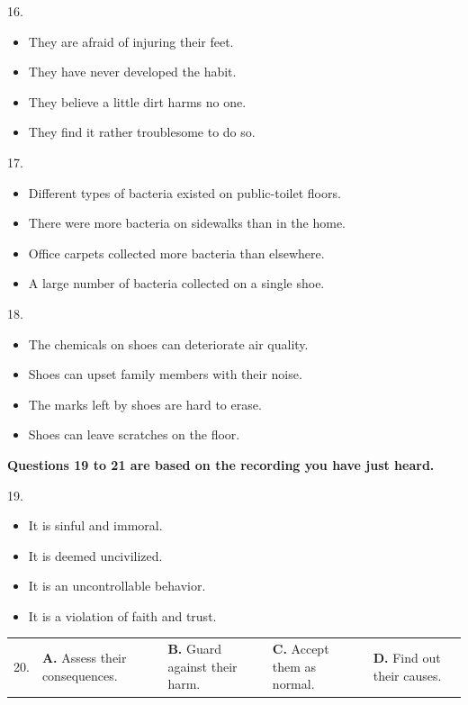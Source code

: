 \documentclass[UTF8,11pt]{ctexart}
\begin{document}
16.


\begin{itemize}[leftmargin=2em,itemsep=.2em,topsep=.4em]\item[A.] They are afraid of injuring their feet.
\item[B.] They have never developed the habit.
\item[C.] They believe a little dirt harms no one.
\item[D.] They find it rather troublesome to do so.
\end{itemize}

17.


\begin{itemize}[leftmargin=2em,itemsep=.2em,topsep=.4em]\item[A.] Different types of bacteria existed on public-toilet floors.
\item[B.] There were more bacteria on sidewalks than in the home.
\item[C.] Office carpets collected more bacteria than elsewhere.
\item[D.] A large number of bacteria collected on a single shoe.
\end{itemize}

18.


\begin{itemize}[leftmargin=2em,itemsep=.2em,topsep=.4em]\item[A.] The chemicals on shoes can deteriorate air quality.
\item[B.] Shoes can upset family members with their noise.
\item[C.] The marks left by shoes are hard to erase.
\item[D.] Shoes can leave scratches on the floor.
\end{itemize}

\textbf{Questions 19 to 21 are based on the recording you have just heard.}


19.


\begin{itemize}[leftmargin=2em,itemsep=.2em,topsep=.4em]\item[A.] It is sinful and immoral.
\item[B.] It is deemed uncivilized.
\item[C.] It is an uncontrollable behavior.
\item[D.] It is a violation of faith and trust.
\end{itemize}

\noindent\begin{tabularx}{\linewidth}{@{}lXXXX@{}}20. & \textbf{A.} Assess their consequences. & \textbf{B.} Guard against their harm. & \textbf{C.} Accept them as normal. & \textbf{D.} Find out their causes.\\\end{tabularx}\par
\end{document}
